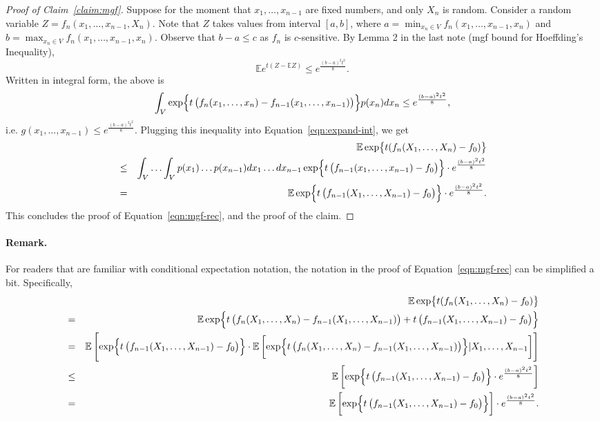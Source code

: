 \documentclass{article}
\newcommand{\EE}{\mathbb{E}} %
\begin{document}
\begin{proof}[Proof of Claim~\ref{claim:mgf}]
Suppose for the moment that $x_1, \ldots, x_{n-1}$ are fixed numbers, and only $X_n$ is random. Consider a random variable $Z = f_n(x_1, \ldots, x_{n-1}, X_n)$. Note that
$Z$ takes values from interval $[a,b]$, where $a = \min_{x_n \in V} f_n(x_1, \ldots, x_{n-1}, x_n)$ and $b = \max_{x_n \in V} f_n(x_1, \ldots, x_{n-1}, x_n)$. Observe that $b - a \leq c$ as $f_n$ is $c$-sensitive. By Lemma 2 in the last note (mgf bound for Hoeffding's Inequality),
\[ \EE e^{t(Z - \EE Z)} \leq e^{\frac{(b-a)^2t^2}{8}}. \]
Written in integral form, the above is
\[ \int_V \exp{ t\del{f_n(x_1,\ldots,x_n) - f_{n-1}(x_1,\ldots,x_{n-1})}} p(x_n) d x_n \leq e^{\frac{(b-a)^2t^2}{8}}, \]
i.e. $g(x_1, \ldots, x_{n-1}) \leq e^{\frac{(b-a)^2t^2}{8}}$. Plugging this inequality into Equation~\eqref{eqn:expand-int}, we get
\begin{eqnarray*}
  && \EE \exp{t (f_n(X_1,\ldots,X_n) - f_0)} \\
  &\leq& \int_V \ldots \int_V p(x_1) \ldots p(x_{n-1}) d x_1 \ldots d x_{n-1} \exp{t\del{f_{n-1}(x_1,\ldots,x_{n-1}) - f_0}} \cdot e^{\frac{(b-a)^2t^2}{8}} \\
  &=& \EE \exp{t\del{f_{n-1}(X_1,\ldots,X_{n-1}) - f_0}} \cdot e^{\frac{(b-a)^2t^2}{8}}.
\end{eqnarray*}
This concludes the proof of Equation~\eqref{eqn:mgf-rec}, and the proof of the claim.
\end{proof}

\paragraph{Remark.} For readers that are familiar with conditional expectation notation, the notation in the proof of Equation~\eqref{eqn:mgf-rec} can be simplified a bit. Specifically,
\begin{eqnarray*}
&& \EE \exp{t (f_n(X_1,\ldots,X_n) - f_0)} \\
&=& \EE \exp{ t\del{f_n(X_1,\ldots,X_n) - f_{n-1}(X_1,\ldots,X_{n-1})} + t\del{f_{n-1}(X_1,\ldots,X_{n-1}) - f_0}} \nonumber\\
&=& \EE \sbr{ \exp{t\del{f_{n-1}(X_1,\ldots,X_{n-1}) - f_0}} \cdot
\EE\sbr{\exp{ t\del{f_n(X_1,\ldots,X_n) - f_{n-1}(X_1,\ldots,X_{n-1})}} \vert X_1,\ldots,X_{n-1}} } \\
&\leq& \EE \sbr{ \exp{t\del{f_{n-1}(X_1,\ldots,X_{n-1}) - f_0}} \cdot
e^{\frac{(b-a)^2t^2}{8}} } \\
&=& \EE \sbr{ \exp{t\del{f_{n-1}(X_1,\ldots,X_{n-1}) - f_0}}} \cdot
e^{\frac{(b-a)^2t^2}{8}}.
\end{eqnarray*}
\end{document}
